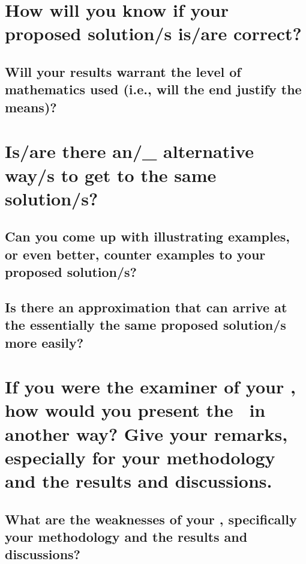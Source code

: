 \textcolor[rgb]{0.75,0.75,0.75}{\blindtext}





\section*{How will you know if your proposed solution/s is/are correct?}

\textcolor[rgb]{0.75,0.75,0.75}{\blindtext} 
			
			
\subsection*{Will your results warrant the level of mathematics used (i.e., will the end justify the means)?}
	    
\textcolor[rgb]{0.75,0.75,0.75}{\blindtext}
			





\section*{Is/are there an/\_ alternative way/s to get to the same solution/s?}

\textcolor[rgb]{0.75,0.75,0.75}{\blindtext}
	
	
\subsection*{Can you come up with illustrating examples, or even better, counter examples to your proposed solution/s?}

\textcolor[rgb]{0.75,0.75,0.75}{\blindtext}
	
	
\subsection*{Is there an approximation that can arrive at the essentially the same proposed solution/s more easily?}
	
\textcolor[rgb]{0.75,0.75,0.75}{\blindtext}
			
	
	
	
	
\section*{If you were the examiner of your \documentType, how would you present the \documentType \ in another way?  Give your remarks, especially for your methodology and the results and discussions.}

	
\textcolor[rgb]{0.75,0.75,0.75}{\blindtext}
	
	
\subsection*{What are the weaknesses of your \documentType, specifically  your methodology and the results and discussions?}

\textcolor[rgb]{0.75,0.75,0.75}{\blindtext}
